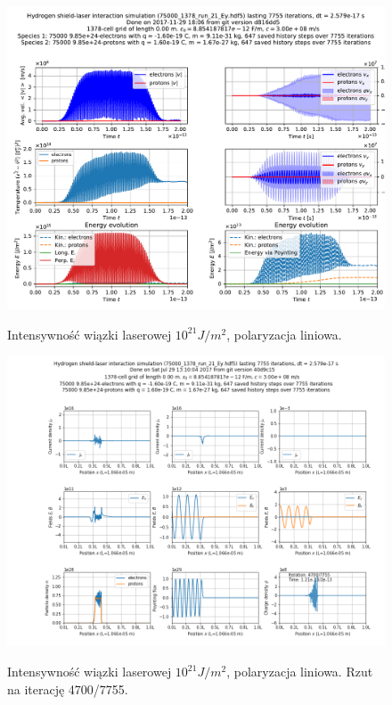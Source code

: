 \begin{figure}[h!]
  \includegraphics[width=\textwidth]{Images/75000_1378_run_21_Ey}
  \label{fig:laser-21-Ey}
  \caption{Intensywność wiązki laserowej $10^{21} J/m^2$, polaryzacja liniowa.}
\end{figure}

\begin{figure}[h!]
  \includegraphics[width=\textwidth]{Images/75000_1378_run_21_Ey_004700}
  \label{fig:laser-21-Ey-snapshot}
  \caption{Intensywność wiązki laserowej $10^{21} J/m^2$, polaryzacja liniowa. Rzut na iterację 4700/7755.}
\end{figure}

